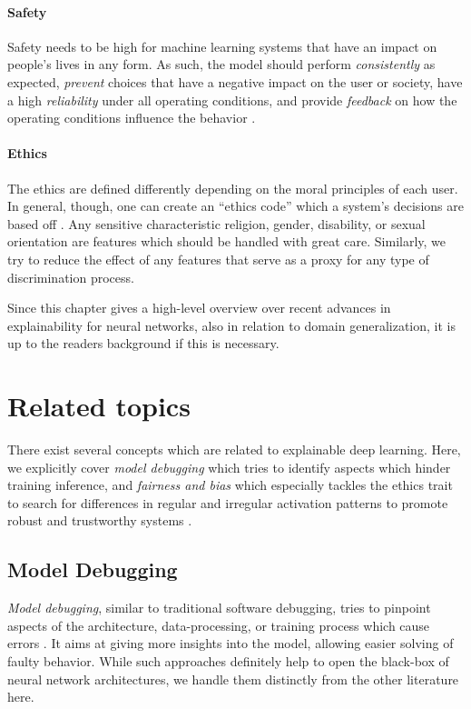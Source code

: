 \paragraph{Safety}
Safety needs to be high for machine learning systems that have an impact on people's lives in any form. As such, the model should perform \emph{consistently} as expected, \emph{prevent} choices that have a negative impact on the user or society, have a high \emph{reliability} under all operating conditions, and provide \emph{feedback} on how the operating conditions influence the behavior \citep{xie2020explainable}.

\paragraph{Ethics}
The ethics are defined differently depending on the moral principles of each user. In general, though, one can create an ``ethics code'' which a system's decisions are based off \citep{xie2020explainable}. Any sensitive characteristic \eg  religion, gender, disability, or sexual orientation are features which should be handled with great care. Similarly, we try to reduce the effect of any features that serve as a proxy for any type of discrimination process.

Since this chapter gives a high-level overview over recent advances in explainability for neural networks, also in relation to domain generalization, it is up to the readers background if this is necessary. 

\section{Related topics}
There exist several concepts which are related to explainable deep learning. Here, we explicitly cover \emph{model debugging} which tries to identify aspects which hinder training inference, and \emph{fairness and bias} which especially tackles the ethics trait to search for differences in regular and irregular activation patterns to promote robust and trustworthy systems \citep{xie2020explainable}. 

\subsection{Model Debugging}
\emph{Model debugging}, similar to traditional software debugging, tries to pinpoint aspects of the architecture, data-processing, or training process which cause errors \citep{xie2020explainable}. It aims at giving more insights into the model, allowing easier solving of faulty behavior. While such approaches definitely help to open the black-box of neural network architectures, we handle them distinctly from the other literature here. 

